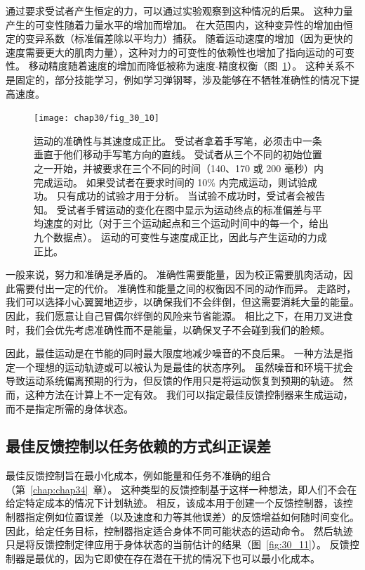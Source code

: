 通过要求受试者产生恒定的力，可以通过实验观察到这种情况的后果。
这种力量产生的可变性随着力量水平的增加而增加。
在大范围内，这种变异性的增加由恒定的变异系数（标准偏差除以平均力）捕获。
随着运动速度的增加（因为更快的速度需要更大的肌肉力量），这种对力的可变性的依赖性也增加了指向运动的可变性。
移动精度随着速度的增加而降低被称为速度-精度权衡（图~\ref{fig:30_10}）。
这种关系不是固定的，部分技能学习，例如学习弹钢琴，涉及能够在不牺牲准确性的情况下提高速度。


\begin{figure}[htbp]
	\centering
	\texttt{[image: chap30/fig\_30\_10]}
	\caption{运动的准确性与其速度成正比。
		受试者拿着手写笔，必须击中一条垂直于他们移动手写笔方向的直线。
		受试者从三个不同的初始位置之一开始，并被要求在三个不同的时间（140、170 或 200 毫秒）内完成运动。
		如果受试者在要求时间的 10\% 内完成运动，则试验成功。
		只有成功的试验才用于分析。
		当试验不成功时，受试者会被告知。
		受试者手臂运动的变化在图中显示为运动终点的标准偏差与平均速度的对比（对于三个运动起点和三个运动时间中的每一个，给出九个数据点）。
		运动的可变性与速度成正比，因此与产生运动的力成正比\cite{schmidt1979motor}。}
	\label{fig:30_10}
\end{figure}


一般来说，努力和准确是矛盾的。
准确性需要能量，因为校正需要肌肉活动，因此需要付出一定的代价。
准确性和能量之间的权衡因不同的动作而异。
走路时，我们可以选择小心翼翼地迈步，以确保我们不会绊倒，但这需要消耗大量的能量。
因此，我们愿意让自己冒偶尔绊倒的风险来节省能源。
相比之下，在用刀叉进食时，我们会优先考虑准确性而不是能量，以确保叉子不会碰到我们的脸颊。


因此，最佳运动是在节能的同时最大限度地减少噪音的不良后果。
一种方法是指定一个理想的运动轨迹或可以被认为是最佳的状态序列。
虽然噪音和环境干扰会导致运动系统偏离预期的行为，但反馈的作用只是将运动恢复到预期的轨迹。
然而，这种方法在计算上不一定有效。
我们可以指定最佳反馈控制器来生成运动，而不是指定所需的身体状态。



\subsection{最佳反馈控制以任务依赖的方式纠正误差}

最佳反馈控制旨在最小化成本，例如能量和任务不准确的组合（第~\ref{chap:chap34}~章）。
这种类型的反馈控制基于这样一种想法，即人们不会在给定特定成本的情况下计划轨迹。
相反，该成本用于创建一个反馈控制器，该控制器指定例如位置误差（以及速度和力等其他误差）的反馈增益如何随时间变化。
因此，给定任务目标，控制器指定适合身体不同可能状态的运动命令。
然后轨迹只是将反馈控制定律应用于身体状态的当前估计的结果（图~\ref{fig:30_11}）。
反馈控制器是最优的，因为它即使在存在潜在干扰的情况下也可以最小化成本。


